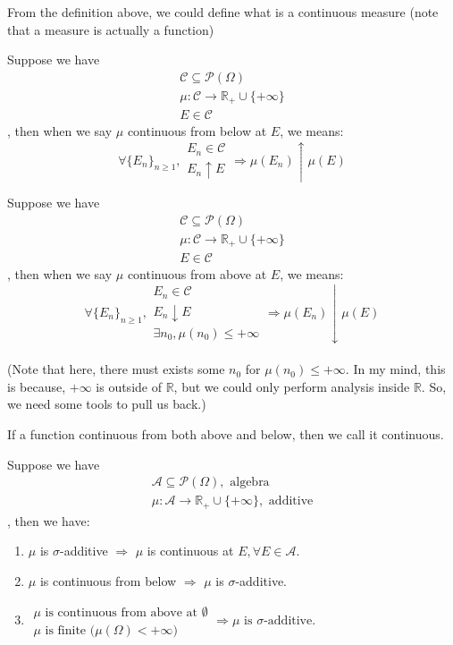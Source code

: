 From the definition above, we could define what is a continuous measure (note that a measure is actually a function)

\begin{define}
  Suppose we have
  \[\substack{
      \mathcal{C}\subseteq\mathcal{P}(\Omega) \\
      \mu:\mathcal{C} \to \mathbb{R}_+\cup\{+\infty\} \\
      E\in\mathcal{C}
  }\],
  then when we say $\mu$ continuous from below at $E$, we means:
  \[\forall \{E_n\}_{n\geq 1} , \substack{E_n\in\mathcal{C}\\E_n\uparrow E} \Rightarrow \mu(E_n)\uparrow\mu(E)\] 
\end{define}

\begin{define}
  Suppose we have
  \[\substack{
      \mathcal{C} \subseteq \mathcal{P}(\Omega) \\
      \mu : \mathcal{C} \to \mathbb{R}_+ \cup \{+\infty\} \\
      E \in \mathcal{C} 
    }\],
  then when we say $\mu$ continuous from above at $E$, we means:
  \[
    \forall \{E_n\}_{n\geq 1} , \substack{E_n \in\mathcal{C} \\ E_n\downarrow E \\ \exists n_0, \mu(n_0) \leq +\infty} \Rightarrow \mu(E_n)\downarrow\mu(E)
  \] \\
  (Note that here, there must exists some $n_0$ for $\mu(n_0)\leq +\infty$.
  In my mind, this is because, $+\infty$ is outside of $\mathbb{R}$, but we could only perform analysis inside $\mathbb{R}$.
  So, we need some tools to pull us back.)
\end{define}

\begin{define}
  If a function continuous from both above and below, then we call it continuous.
\end{define}

\begin{lemma}
  Suppose we have \[\substack{
    \mathcal{A}\subseteq \mathcal{P}(\Omega), \mbox{ algebra} \\
    \mu : \mathcal{A} \to \mathbb{R}_+\cup\{+\infty\}, \mbox{ additive}
  }\],
  then we have:
  \begin{enumerate}
  \item $\mu$ is $\sigma$-additive $\Rightarrow$ $\mu$ is continuous at $E, \forall E\in \mathcal{A}$.
  \item $\mu$ is continuous from below $\Rightarrow$ $\mu$ is $\sigma$-additive.
  \item $\substack{
      \mbox{$\mu$ is continuous from above at $\emptyset$}\\
      \mbox{$\mu$ is finite ($\mu(\Omega) < +\infty$)}
    } \Rightarrow \mbox{$\mu$ is $\sigma$-additive.}$
  \end{enumerate}
\end{lemma}

